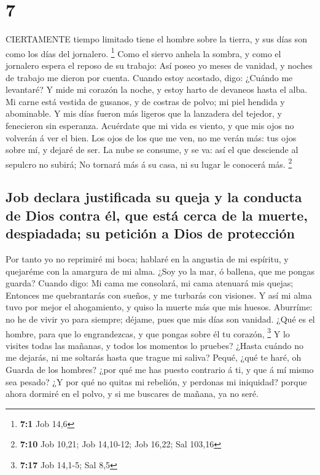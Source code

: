 \hypertarget{section-6}{%
\section{7}\label{section-6}}

 CIERTAMENTE tiempo limitado tiene el hombre sobre la
tierra, y sus días son como los días del jornalero. \footnote{\textbf{7:1}
  Job 14,6}  Como el siervo anhela la sombra, y como el
jornalero espera el reposo de su trabajo:  Así poseo yo
meses de vanidad, y noches de trabajo me dieron por cuenta. 
Cuando estoy acostado, digo: ¿Cuándo me levantaré? Y mide mi corazón la
noche, y estoy harto de devaneos hasta el alba.  Mi carne
está vestida de gusanos, y de costras de polvo; mi piel hendida y
abominable.  Y mis días fueron más ligeros que la lanzadera
del tejedor, y fenecieron sin esperanza.  Acuérdate que mi
vida es viento, y que mis ojos no volverán á ver el bien. 
Los ojos de los que me ven, no me verán más: tus ojos sobre mí, y dejaré
de ser.  La nube se consume, y se va: así el que desciende
al sepulcro no subirá;  No tornará más á su casa, ni su
lugar le conocerá más. \footnote{\textbf{7:10} Job 10,21; Job 14,10-12;
  Job 16,22; Sal 103,16}

\hypertarget{job-declara-justificada-su-queja-y-la-conducta-de-dios-contra-uxe9l-que-estuxe1-cerca-de-la-muerte-despiadada-su-peticiuxf3n-a-dios-de-protecciuxf3n}{%
\subsection{Job declara justificada su queja y la conducta de Dios
contra él, que está cerca de la muerte, despiadada; su petición a Dios
de
protección}\label{job-declara-justificada-su-queja-y-la-conducta-de-dios-contra-uxe9l-que-estuxe1-cerca-de-la-muerte-despiadada-su-peticiuxf3n-a-dios-de-protecciuxf3n}}

 Por tanto yo no reprimiré mi boca; hablaré en la angustia
de mi espíritu, y quejaréme con la amargura de mi alma. 
¿Soy yo la mar, ó ballena, que me pongas guarda?  Cuando
digo: Mi cama me consolará, mi cama atenuará mis quejas; 
Entonces me quebrantarás con sueños, y me turbarás con visiones.
 Y así mi alma tuvo por mejor el ahogamiento, y quiso la
muerte más que mis huesos.  Aburríme: no he de vivir yo
para siempre; déjame, pues que mis días son vanidad.  ¿Qué
es el hombre, para que lo engrandezcas, y que pongas sobre él tu
corazón, \footnote{\textbf{7:17} Job 14,1-5; Sal 8,5}  Y lo
visites todas las mañanas, y todos los momentos lo pruebes?
 ¿Hasta cuándo no me dejarás, ni me soltarás hasta que
trague mi saliva?  Pequé, ¿qué te haré, oh Guarda de los
hombres? ¿por qué me has puesto contrario á ti, y que á mí mismo sea
pesado?  ¿Y por qué no quitas mi rebelión, y perdonas mi
iniquidad? porque ahora dormiré en el polvo, y si me buscares de mañana,
ya no seré.

